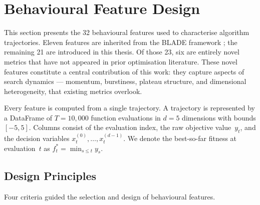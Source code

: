 
\chapter{Behavioural Feature Design}
\label{ch:features}

This section presents the 32 behavioural features used to characterise algorithm
trajectories.  Eleven features are inherited from the BLADE framework
\cite{vanStein2025BLADE, vanStein2025Behaviour}; the remaining 21 are introduced
in this thesis.  Of those 23, six are entirely novel metrics that have not
appeared in prior optimisation literature.  These novel features constitute a
central contribution of this work: they capture aspects of search dynamics ---
momentum, burstiness, plateau structure, and dimensional heterogeneity, that
existing metrics overlook.

Every feature is computed from a single trajectory. A trajectory is represented by a DataFrame of $T = 10{,}000$
function evaluations in $d = 5$ dimensions with bounds $[-5, 5]$.  Columns
consist of the evaluation index, the raw objective value~$y_t$, and the decision
variables $x_t^{(0)}, \ldots, x_t^{(d-1)}$.  We denote the best-so-far fitness
at evaluation~$t$ as $f^*_t = \min_{s \le t} y_s$.

\section{Design Principles}
\label{sec:features:principles}

Four criteria guided the selection and design of behavioural features.

